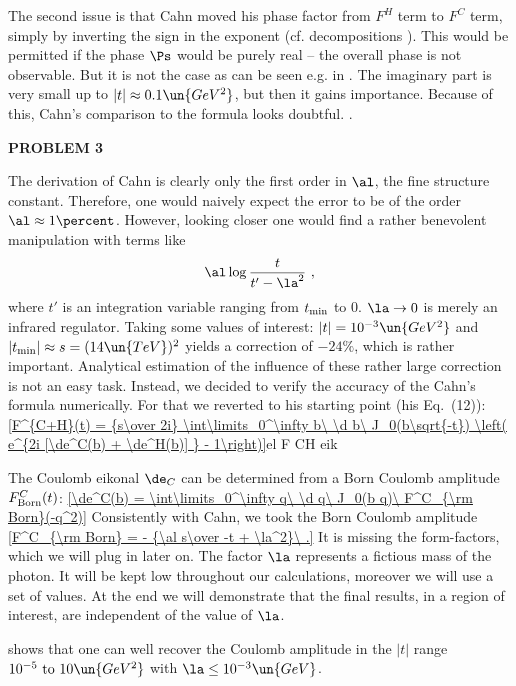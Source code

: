 The second issue is that Cahn moved his phase factor from $F^H$ term to $F^C$ term, simply by inverting the sign in the exponent (cf. decompositions ). This would be permitted if the phase $\Ps$ would be purely real -- the overall phase is not observable. But it is not the case as can be seen e.g. in . The imaginary part is very small up to $|t|\approx 0.1\un{GeV^2}$, but then it gains importance. Because of this, Cahn's comparison to the \WY{} formula looks doubtful. .

{\bf PROBLEM 3}

The derivation of Cahn  is clearly only the first order in $\al$, the fine structure constant. Therefore, one would naively expect the error to be of the order $\al\approx 1\percent$. However, looking closer one would find a rather benevolent manipulation with terms like
$$\al \log {t\over t' - \la^2}\ ,$$
where $t'$ is an integration variable ranging from $t_{\rm min}$ to $0$. $\la\to0$ is merely an infrared regulator. Taking some values of interest: $|t| = 10^{-3}\un{GeV^2}$ and $|t_{\rm min}| \approx s = (14\un{TeV})^2$ yields a correction of $-24\percent$, which is rather important. Analytical estimation of the influence of these rather large correction is not an easy task. Instead, we decided to verify the accuracy of the Cahn's formula numerically. For that we reverted to his starting point (his Eq.~(12)):
\eqref{F^{C+H}(t) = {s\over 2i} \int\limits_0^\infty b\ \d b\ J_0(b\sqrt{-t}) \left( e^{2i [\de^C(b) + \de^H(b)] } - 1\right)}{el F CH eik}

The Coulomb eikonal $\de_C$ can be determined from a Born Coulomb amplitude $F^C_{\rm Born}(t)$:
\eqref{\de^C(b) = \int\limits_0^\infty q\ \d q\ J_0(b q)\ F^C_{\rm Born}(-q^2)}{}
Consistently with Cahn, we took the Born Coulomb amplitude
\eqref{F^C_{\rm Born} = - {\al s\over -t + \la^2}\ .}{}
It is missing the form-factors, which we will plug in later on. The factor $\la$ represents a fictious mass of the photon. It will be kept low throughout our calculations, moreover we will use a set of values. At the end we will demonstrate that the final results, in a region of interest, are independent of the value of $\la$.

 shows that one can well recover the Coulomb amplitude in the $|t|$ range $10^{-5}\hbox{ to } 10\un{GeV^2}$ with $\la \le 10^{-3}\un{GeV}$.


